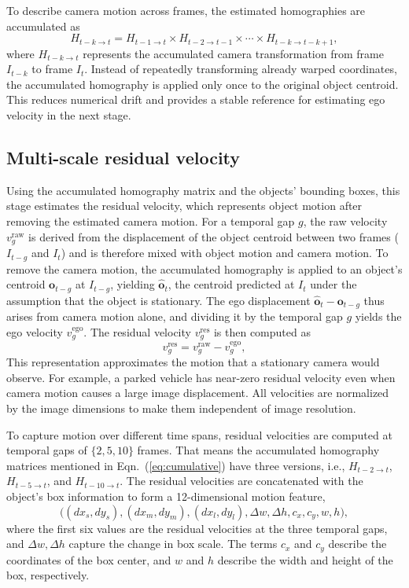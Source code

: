 \documentclass{article}
\begin{document}
To describe camera motion across frames, the estimated homographies are accumulated as
\begin{equation}
  H_{t-k \to t} = H_{t-1 \to t} \times H_{t-2 \to t-1} \times \cdots \times H_{t-k \to t-k+1},
  \label{eq:cumulative}
\end{equation}
where $H_{t-k \to t}$ represents the accumulated camera transformation from frame $I_{t-k}$ to frame $I_t$. Instead of repeatedly transforming already warped coordinates, the accumulated homography is applied only once to the original object centroid. This reduces numerical drift and provides a stable reference for estimating ego velocity in the next stage.

\subsection{Multi-scale residual velocity}
\label{sec:residual}
Using the accumulated homography matrix and the objects' bounding boxes, this stage estimates the residual velocity, which represents object motion after removing the estimated camera motion. For a temporal gap $g$, the raw velocity $v^{\mathrm{raw}}_{g}$ is derived from the displacement of the object centroid between two frames ($I_{t-g}$ and $I_{t}$) and is therefore mixed with object motion and camera motion. To remove the camera motion, the accumulated homography is applied to an object's centroid $\boldsymbol{o}_{t-g}$ at $I_{t-g}$, yielding $\hat{\boldsymbol{o}}_{t}$, the centroid predicted at $I_{t}$ under the assumption that the object is stationary. The ego displacement $\hat{\boldsymbol{o}}_{t}-\boldsymbol{o}_{t-g}$ thus arises from camera motion alone, and dividing it by the temporal gap $g$ yields the ego velocity $v^{\mathrm{ego}}_{g}$. The residual velocity $v^{\mathrm{res}}_{g}$ is then computed as
\begin{equation}
  v^{\mathrm{res}}_{g} = v^{\mathrm{raw}}_{g} - v^{\mathrm{ego}}_{g},
  \label{eq:residual}
\end{equation}
This representation approximates the motion that a stationary camera would observe. For example, a parked vehicle has near-zero residual velocity even when camera motion causes a large image displacement. All velocities are normalized by the image dimensions to make them independent of image resolution.

To capture motion over different time spans, residual velocities are computed at temporal gaps of $\{2,5,10\}$ frames. That means the accumulated homography matrices mentioned in Eqn.~(\ref{eq:cumulative}) have three versions, i.e., $H_{t-2 \to t}$, $H_{t-5 \to t}$, and $H_{t-10 \to t}$. The residual velocities are concatenated with the object's box information to form a 12-dimensional motion feature,
\begin{equation}
  \bigl((dx_s,dy_s),(dx_m,dy_m),(dx_l,dy_l),\Delta w,\Delta h,c_x,c_y,w,h\bigr),
  \label{eq:descriptor}
\end{equation}
where the first six values are the residual velocities at the three temporal gaps, and $\Delta w, \Delta h$ capture the change in box scale. The terms $c_x$ and $c_y$ describe the coordinates of the box center, and $w$ and $h$ describe the width and height of the box, respectively.
\end{document}

